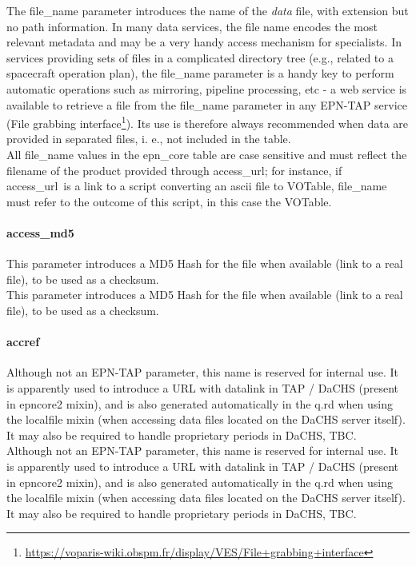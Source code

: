 \documentclass[11pt,a4paper]{ivoa}
\begin{document}
The file\_name parameter introduces the name of the \emph{data} file, with extension but no path information. In many data services, the file name encodes the most relevant metadata and may be a very handy access mechanism for specialists. In services providing sets of files in a complicated directory tree (e.g., related to a spacecraft operation plan), the file\_name parameter is a handy key to perform automatic operations such as mirroring, pipeline processing, etc - a web service is available to retrieve a file from the file\_name parameter in any EPN-TAP service (File grabbing interface\footnote{\url{https://voparis-wiki.obspm.fr/display/VES/File+grabbing+interface}}). Its use is therefore always recommended when data are provided in separated files, i. e., not included in the table.\\All file\_name values in the epn\_core table are case sensitive and must reflect the filename of the product provided through access\_url; for instance, if access\_url is a link to a script converting an ascii file to VOTable, file\_name must refer to the outcome of this script, in this case the VOTable.

\paragraph{access\_md5}

This parameter introduces a MD5 Hash for the file when available (link to a real file), to be used as a checksum.\\

This parameter introduces a MD5 Hash for the file when available (link to a real file), to be used as a checksum.\\

\paragraph{accref}

Although not an EPN-TAP parameter, this name is reserved for internal use. It is apparently used to introduce a URL with datalink in TAP / DaCHS (present in epncore2 mixin), and is also generated automatically in the q.rd when using the localfile mixin (when accessing data files located on the DaCHS server itself). It may also be required to handle proprietary periods in DaCHS, TBC. \\

Although not an EPN-TAP parameter, this name is reserved for internal use. It is apparently used to introduce a URL with datalink in TAP / DaCHS (present in epncore2 mixin), and is also generated automatically in the q.rd when using the localfile mixin (when accessing data files located on the DaCHS server itself). It may also be required to handle proprietary periods in DaCHS, TBC. \\
\end{document}
